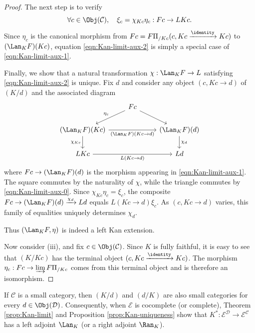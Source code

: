 \begin{proof}
	The next step is to verify
	\begin{equation}\label{eqn:Kan-limit-aux-2}
		\forall c \in \Obj(\mathcal{C}), \quad \xi_c = \chi_{Kc} \eta_c: Fc \to LKc.
	\end{equation}
	Since $\eta_c$ is the canonical morphism from
	$Fc=F\Pi_{/Kc}(c,Kc\xrightarrow{\identity}Kc)$ to
	$(\Lan_K F)(Kc)$, equation \eqref{eqn:Kan-limit-aux-2} is simply a special
	case of \eqref{eqn:Kan-limit-aux-1}.

	Finally, we show that a natural transformation $\chi:\Lan_K F\to L$
	satisfying \eqref{eqn:Kan-limit-aux-2} is unique. Fix $d$ and consider any
	object $(c,Kc\to d)$ of $(K/d)$ and the associated diagram
	\[\begin{tikzcd}
		& Fc \arrow[ld, "{\eta_c}"'] \arrow[rd] & \\
		(\Lan_K F)(Kc) \arrow[rr, "{(\Lan_K F)(Kc \to d)}"'] \arrow[d, "{\chi_{Kc}}"'] & & (\Lan_K F)(d) \arrow[d, "\chi_d"] \\
 		LKc \arrow[rr, "{L(Kc \to d)}"'] & & Ld
	\end{tikzcd}\]
	where $Fc\to(\Lan_K F)(d)$ is the morphism appearing in
	\eqref{eqn:Kan-limit-aux-1}. The square commutes by the naturality of
	$\chi$, while the triangle commutes by \eqref{eqn:Kan-limit-aux-0}. Since
	$\chi_{Kc}\eta_c=\xi_c$, the composite
	$Fc\to(\Lan_K F)(d)\xrightarrow{\chi_d}Ld$ equals
	$L(Kc\to d)\xi_c$. As $(c,Kc\to d)$ varies, this family of equalities
	uniquely determines $\chi_d$.

	Thus $\left(\Lan_K F,\eta\right)$ is indeed a left Kan extension.

	Now consider (iii), and fix $c\in\Obj(\mathcal{C})$. Since $K$ is fully
	faithful, it is easy to see that $(K/Kc)$ has the terminal object
	$(c,Kc\xrightarrow{\identity}Kc)$. The morphism
	$\eta_c:Fc\to\varinjlim F\Pi_{/Kc}$ comes from this terminal object and is
	therefore an isomorphism.
\end{proof}

\begin{remark}
	If $\mathcal{C}$ is a small category, then $(K/d)$ and $(d/K)$ are also
	small categories for every $d\in\Obj(\mathcal{D})$. Consequently, when
	$\mathcal{E}$ is cocomplete (or complete), Theorem \ref{prop:Kan-limit} and
	Proposition \ref{prop:Kan-uniqueness} show that
	$K^*: \mathcal{E}^{\mathcal{D}} \to \mathcal{E}^{\mathcal{C}}$ has a left
	adjoint $\Lan_K$ (or a right adjoint $\Ran_K$).
\end{remark}

